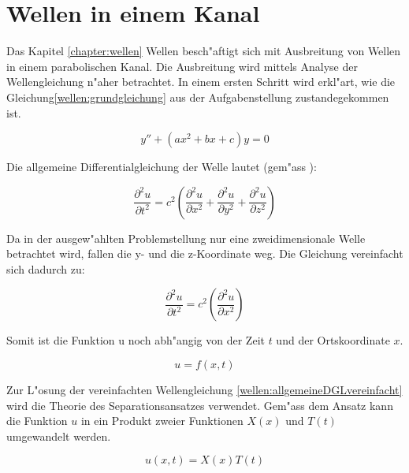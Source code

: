 \chapter{Wellen in einem Kanal\label{chapter:wellen}}
\begin{refsection}
\clearpage

Das Kapitel \ref{chapter:wellen} Wellen besch"aftigt sich mit Ausbreitung von 
Wellen in einem 
parabolischen Kanal. Die Ausbreitung wird mittels Analyse der Wellengleichung 
n"aher betrachtet. In einem ersten Schritt wird erkl"art, wie die 
Gleichung\ref{wellen:grundgleichung} aus der Aufgabenstellung zustandegekommen 
ist.

\begin{equation}
	y'' + (ax^2+bx+c)y
	=
	0
	\label{wellen:grundgleichung}
\end{equation}

Die allgemeine Differentialgleichung der Welle lautet (gem"ass 
\cite{wellen:smirnow2}):

\begin{equation}
	\frac{\partial^2 u}{\partial t^2}
	=
	c^2
	\left(
		\frac{\partial^2 u}{\partial x^2} 
		+ \frac{\partial^2 u}{\partial y^2} 
		+ \frac{\partial^2 u}{\partial z^2}
	\right)
	\label{wellen:allgemeineDGL}
\end{equation}

Da in der ausgew"ahlten Problemstellung nur eine zweidimensionale Welle 
betrachtet wird, fallen die y- und die z-Koordinate weg. Die Gleichung 
vereinfacht sich dadurch zu:

\begin{equation}
	\frac{\partial^2 u}{\partial t^2}
	=
	c^2
	\left(
		\frac{\partial^2 u}{\partial x^2} 
	\right)
	\label{wellen:allgemeineDGLvereinfacht}
\end{equation}

Somit ist die Funktion u noch abh"angig von der Zeit $t$ und der Ortskoordinate 
$x$.

\begin{equation}
	u = f(x,t)
\end{equation}

Zur L"osung der vereinfachten Wellengleichung 
\ref{wellen:allgemeineDGLvereinfacht} wird die Theorie des Separationsansatzes 
verwendet. Gem"ass dem Ansatz kann die Funktion $u$ in ein Produkt zweier 
Funktionen $X(x)$ und $T(t)$ umgewandelt werden.

\begin{equation}
	u (x,t) = X(x) T(t)
	\label{wellen:separierteFunktion}
\end{equation}


\end{refsection}
